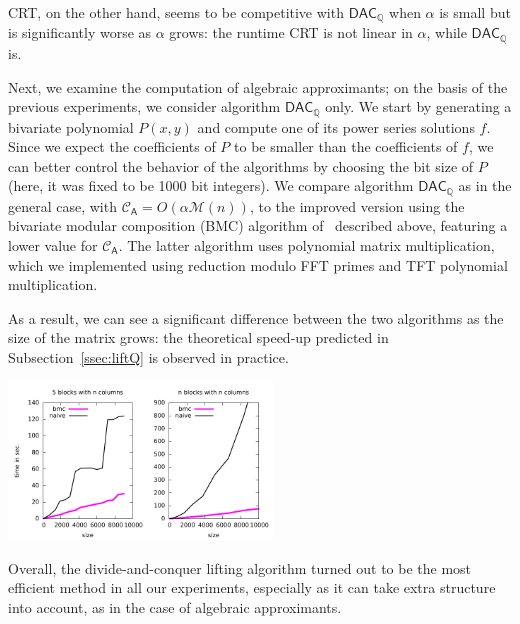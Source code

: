 \documentclass[sigconf]{acmart}
\newcommand{\mA}{\ensuremath{\mathsf{A}}}
\newcommand{\Q}{\ensuremath{\mathbb{Q}}}
\newcommand{\M}{\ensuremath{\mathscr{M}}}
\newcommand{\CA}{\ensuremath{\mathscr{C}_\mA}}
\newcommand{\DACQ}{\ensuremath{\mathsf{DAC}_\Q}}
\theoremstyle{acmdefinition}
\begin{document}
CRT, on the other hand, seems to be competitive with $\DACQ$ when
$\alpha$ is small but is significantly worse as $\alpha$ grows: the
runtime CRT is not linear in $\alpha$, while $\DACQ$ is. 

Next, we examine the computation of algebraic approximants; on the
basis of the previous experiments, we consider algorithm $\DACQ$ only.
We start by generating a bivariate polynomial $P(x,y)$ and compute one
of its power series solutions $f$. Since we expect the coefficients of
$P$ to be smaller than the coefficients of $f$, we can better control
the behavior of the algorithms by choosing the bit size of $P$ (here,
it was fixed to be 1000 bit integers).  We compare algorithm $\DACQ$
as in the general case, with $\CA=O(\alpha \M(n))$, to the improved
version using the bivariate modular composition (BMC) algorithm
of~\cite{NuZi04} described above, featuring a lower value for
$\CA$. The latter algorithm uses polynomial matrix multiplication,
which we implemented using reduction modulo FFT primes and TFT
polynomial multiplication.

As a result, we can see a significant difference between the two
algorithms as the size of the matrix grows: the theoretical speed-up
predicted in Subsection~\ref{ssec:liftQ} is observed in practice.

\includegraphics[width=7cm]{plots/compare-algebraic.pdf}

Overall, the divide-and-conquer lifting algorithm turned out to be the
most efficient method in all our experiments, especially as it can
take extra structure into account, as in the case of algebraic
approximants.



 {\tiny }
\end{document}
